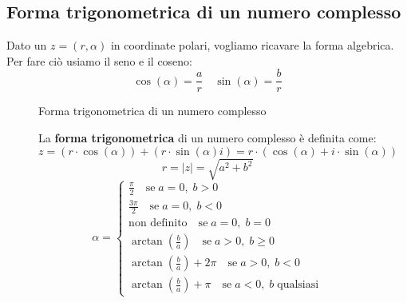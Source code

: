 \documentclass[a4paper]{article}
\theoremstyle{break}
\theoremstyle{break}
\theoremstyle{break}
\theoremstyle{break}
\begin{document}
\subsection{Forma trigonometrica di un numero complesso}
Dato un \( z = (r, \alpha) \) in coordinate polari, vogliamo ricavare la forma algebrica. Per
fare ciò usiamo il seno e il coseno:
\[
  \cos(\alpha) = \frac{a}{r} \quad \sin(\alpha) = \frac{b}{r}
\]
\begin{figure}[H]
  \begin{center}
  \end{center}

  \caption{Forma trigonometrica di un numero complesso}
\end{figure}
\begin{figure}[H]
  \begin{definition}
    La \textbf{forma trigonometrica} di un numero complesso è definita come:
    \[
      z = (r \cdot \cos(\alpha)) + (r \cdot \sin(\alpha)i) = r \cdot (\cos(\alpha) + i \cdot \sin(\alpha))
    \]
    \[
      r = |z| = \sqrt{a^2 + b^2}
    \]
    \[
      \alpha = \begin{cases}
        \frac{\pi}{2} \quad \text{se} \; a = 0,\; b > 0                                   \\
        \frac{3\pi}{2} \quad \text{se} \; a = 0,\; b < 0                                  \\
        \text{non definito} \quad \text{se} \; a = 0,\; b = 0                             \\
        \arctan\left(\frac{b}{a}\right) \quad \text{se} \; a > 0,\; b \ge 0\\
        \arctan\left(\frac{b}{a}\right) + 2\pi \quad \text{se} \; a > 0,\; b < 0         \\
        \arctan\left(\frac{b}{a}\right) + \pi \quad \text{se} \; a < 0,\; b \;\text{qualsiasi}
      \end{cases}
    \]
  \end{definition}
\end{figure}
\end{document}
